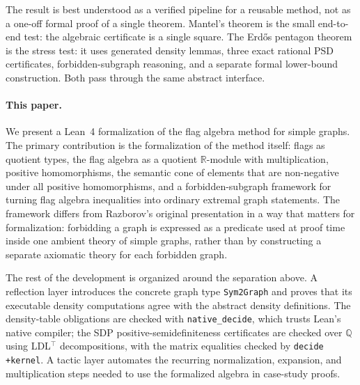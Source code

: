 \documentclass{article}
\newcommand{\lean}[1]{\texttt{#1}}
\begin{document}
The result is best understood as a verified pipeline for a reusable method,
not as a one-off formal proof of a single theorem.  Mantel's theorem is the
small end-to-end test: the algebraic certificate is a single square.  The
Erd\H{o}s pentagon theorem is the stress test: it uses generated density
lemmas, three exact rational PSD certificates, forbidden-subgraph reasoning,
and a separate formal lower-bound construction.  Both pass through the same
abstract interface.

\paragraph{This paper.}
We present a Lean~4 formalization of the flag algebra method for simple
graphs.  The primary contribution is the formalization of the method itself:
flags as quotient types, the flag algebra as a quotient $\mathbb{R}$-module
with multiplication, positive homomorphisms, the semantic cone of elements
that are non-negative under all positive homomorphisms, and a
forbidden-subgraph framework for turning flag algebra inequalities into
ordinary extremal graph statements.  The framework differs from Razborov's
original presentation in a way that matters for formalization: forbidding a
graph is expressed as a predicate used at proof time inside one ambient theory
of simple graphs, rather than by constructing a separate axiomatic theory for
each forbidden graph.

The rest of the development is organized around the separation above.  A
reflection layer introduces the concrete graph type \lean{Sym2Graph} and proves
that its executable density computations agree with the abstract density
definitions.  The density-table obligations are checked with
\lean{native\_decide}, which trusts Lean's native compiler; the SDP
positive-semidefiniteness certificates are checked over $\mathbb{Q}$ using
LDL$^\top$ decompositions, with the matrix equalities checked by
\lean{decide +kernel}.  A tactic layer automates the recurring normalization,
expansion, and multiplication steps needed to use the formalized algebra in
case-study proofs.
\end{document}
